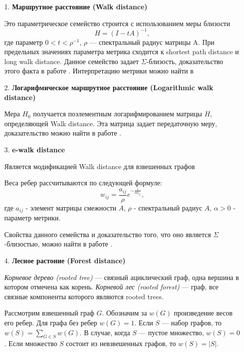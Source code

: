 \begin{itemize}
\item[1.] \textbf{Маршрутное расстояние (Walk distance)}

Это параметрическое семейство строится с использованием меры близости 
\begin{equation}
H = (I - tA)^{-1},
\end{equation}
где параметр $0 < t < \rho ^{-1}$, $\rho$ --- спектральный радиус матрицы A. При предельных значениях параметра метрика сходится к shortest path distance и long walk distance. Данное семейство задает $\Sigma$-близость, доказательство этого факта в работе \cite{chebotarev2012walk}. Интерпретацию метрики можно найти в \cite{chebotarev2012walk}

\item[2.] \textbf{Логарифмическое маршрутное расстояние (Logarithmic walk distance)}

Мера $H_0$ получается поэлементным логарифмированием матрицы $H$, определяющей Walk distance. Эта матрица задает передаточную меру, доказательство можно найти в работе \cite{chebotarev2011bottleneck}.

\item[3.] \textbf{e-walk distance}

Является модификацией Walk distance для взвешенных графов 

Веса ребер рассчитываются по следующей формуле: \begin{equation}
w_{ij} = \frac{a_{ij}}{\rho} e^{-\frac{1}{\alpha a_{ij}}},
\end{equation} где $a_{ij}$ - элемент матрицы смежности $A$, $\rho$ - спектральный радиус $A$, $\alpha > 0$ - параметр метрики.

Свойства данного семейства и доказательство того, что оно является $\Sigma$-близостью, можно найти в работе \cite{chebotarev2012walk}.

\item[4.] \textbf{Лесное растоние (Forest distance)}

\emph{Корневое дерево (rooted tree)} --- связный ациклический граф, одна вершина в котором отмечена как корень. \emph{Корневой лес (rooted forest)} --- граф, все связные компоненты которого являются rooted trees.

Рассмотрим взвешенный граф $G$. Обозначим за $w(G)$ произведение весов его ребер. Для графа без ребер $w(G) = 1$. Если $S$ --- набор графов, то $w(S) = \sum\limits_{G \in S} w(G)$.  В случае, когда $S$ --- пустое множество, $w(S) = 0$. Если множество $S$ состоит из невзвешенных графов, то $w(S) = |S|$.


\end{itemize}
